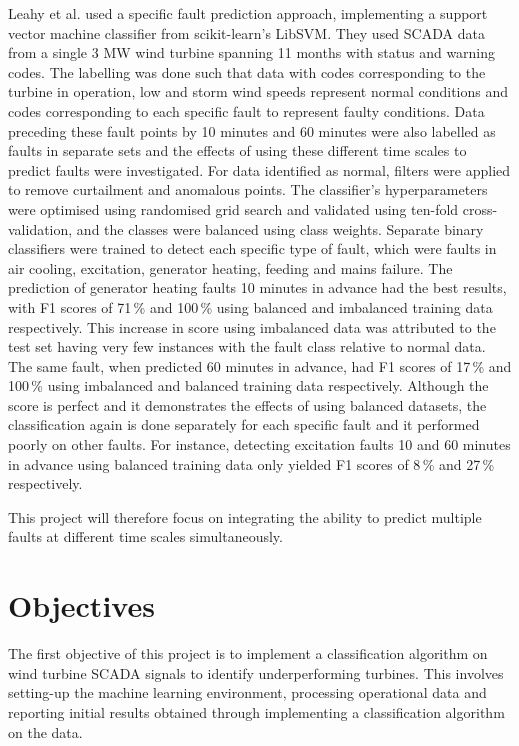Leahy et al. \cite{Leahy16} used a specific fault prediction approach, implementing a support vector machine classifier from scikit-learn’s LibSVM. They used SCADA data from a single 3 MW wind turbine spanning 11 months with status and warning codes. The labelling was done such that data with codes corresponding to the turbine in operation, low and storm wind speeds represent normal conditions and codes corresponding to each specific fault to represent faulty conditions. Data preceding these fault points by 10 minutes and 60 minutes were also labelled as faults in separate sets and the effects of using these different time scales to predict faults were investigated. For data identified as normal, filters were applied to remove curtailment and anomalous points. The classifier’s hyperparameters were optimised using randomised grid search and validated using ten-fold cross-validation, and the classes were balanced using class weights. Separate binary classifiers were trained to detect each specific type of fault, which were faults in air cooling, excitation, generator heating, feeding and mains failure. The prediction of generator heating faults 10 minutes in advance had the best results, with F1 scores of 71\,\% and 100\,\% using balanced and imbalanced training data respectively. This increase in score using imbalanced data was attributed to the test set having very few instances with the fault class relative to normal data. The same fault, when predicted 60 minutes in advance, had F1 scores of 17\,\% and 100\,\% using imbalanced and balanced training data respectively. Although the score is perfect and it demonstrates the effects of using balanced datasets, the classification again is done separately for each specific fault and it performed poorly on other faults. For instance, detecting excitation faults 10 and 60 minutes in advance using balanced training data only yielded F1 scores of 8\,\% and 27\,\% respectively.

This project will therefore focus on integrating the ability to predict multiple faults at different time scales simultaneously.

\section{Objectives}

The first objective of this project is to implement a classification algorithm on wind turbine SCADA signals to identify underperforming turbines. This involves setting-up the machine learning environment, processing operational data and reporting initial results obtained through implementing a classification algorithm on the data.

